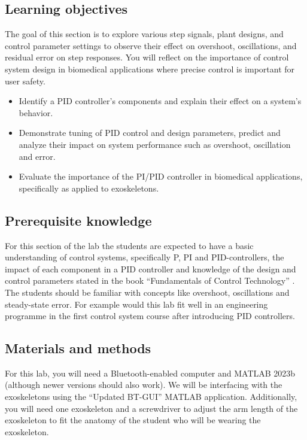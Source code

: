 \subsection{Learning objectives}
The goal of this section is to explore various step signals, plant designs, and control parameter settings to observe their effect on overshoot, oscillations, and residual error on step responses. You will reflect on the importance of control system design in biomedical applications where precise control is important for user safety.

\begin{itemize}[]
	\item Identify a PID controller's components and explain their effect on a system’s behavior.
	\item 	Demonstrate tuning of PID control and design parameters, predict and analyze their impact on system performance such as overshoot, oscillation and error.
	\item Evaluate the importance of the PI/PID controller in biomedical applications, specifically as applied to exoskeletons.
\end{itemize}
	
\subsection{Prerequisite knowledge}
For this section of the lab the students are expected to have a basic understanding of control systems, specifically P, PI and PID-controllers, the impact of each component in a PID controller and knowledge of the design and control parameters stated in the book “Fundamentals of Control Technology” \cite{Lennartson2002} . The students should be familiar with concepts like overshoot, oscillations and steady-state error. For example would this lab fit well in an engineering programme in the first control system course after introducing PID controllers. 

\subsection{Materials and methods}
For this lab, you will need a Bluetooth-enabled computer and MATLAB 2023b (although newer versions should also work). We will be interfacing with the exoskeletons using the “Updated BT-GUI” MATLAB application. Additionally, you will need one exoskeleton and a screwdriver to adjust the arm length of the exoskeleton to fit the anatomy of the student who will be wearing the exoskeleton.

